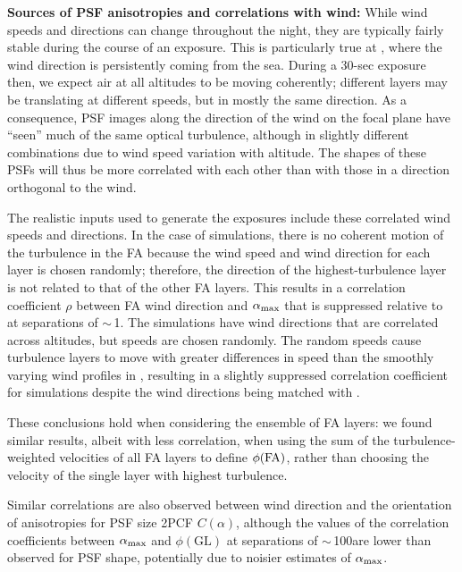 \documentclass[twocolumn,twocolappendix]{openjournal}
\begin{document}
{\bf Sources of PSF anisotropies and correlations with wind:}
While wind speeds and directions can change throughout the night, they are typically fairly stable during the course of an exposure. 
This is particularly true at \cp, where the wind direction is persistently coming from the sea.
During a 30-sec exposure then, we expect air at all altitudes to be moving coherently; different layers may be translating at different speeds, but in mostly the same direction.
As a consequence, PSF images along the direction of the wind on the focal plane have ``seen'' much of the same optical turbulence, although in slightly different combinations due to wind speed variation with altitude. 
The shapes of these PSFs will thus be more correlated with each other than with those in a direction orthogonal to the wind.

The realistic inputs used to generate the \psfwssims exposures include these  correlated wind speeds and directions. 
In the case of \bench simulations, there is no coherent motion of the turbulence in the FA because the wind speed and wind direction for each layer is chosen randomly; therefore, the direction of the highest-turbulence layer is not related to that of the other FA layers.
This results in a correlation coefficient $\rho$ between FA wind direction and $\alpha_{\rm max}$ that is suppressed relative to \psfwssims at separations of $\sim\,$1\amin.
The \match simulations have wind directions that are correlated across altitudes, but speeds are chosen randomly. 
The random speeds cause turbulence layers to move with greater differences in speed than the smoothly varying wind profiles in \psfwssims, resulting in a slightly suppressed correlation coefficient for \match simulations despite the wind directions being matched with \psfwssims.

These conclusions hold when considering the ensemble of FA layers: we found similar results, albeit with less correlation, when using the sum of the turbulence-weighted velocities of all FA layers to define $\phi({\rm FA})$, rather than choosing the velocity of the single layer with highest turbulence.

Similar correlations are also observed between wind direction and the orientation of anisotropies for PSF size 2PCF $C(\alpha)$, although the values of the correlation coefficients between $\alpha_{\rm max}$ and $\phi(\text{GL})$ at separations of $\sim\,$100\amin are lower than observed for PSF shape, potentially due to noisier estimates of $\alpha_{\rm max}$. 
\end{document}
